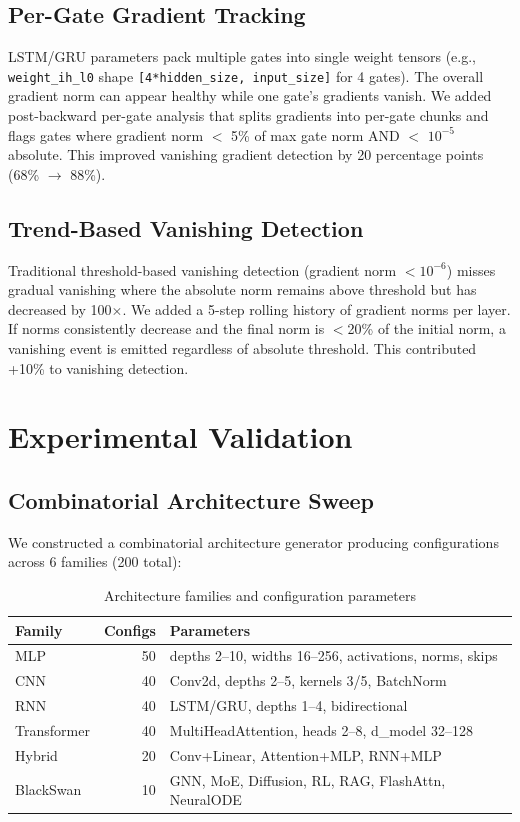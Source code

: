 \documentclass[11pt]{article}
\begin{document}
\subsection{Per-Gate Gradient Tracking}

LSTM/GRU parameters pack multiple gates into single weight tensors (e.g., \texttt{weight\_ih\_l0} shape \texttt{[4*hidden\_size, input\_size]} for 4 gates). The overall gradient norm can appear healthy while one gate's gradients vanish. We added post-backward per-gate analysis that splits gradients into per-gate chunks and flags gates where gradient norm $<$ 5\% of max gate norm AND $<$ $10^{-5}$ absolute. This improved vanishing gradient detection by 20 percentage points (68\% $\rightarrow$ 88\%).

\subsection{Trend-Based Vanishing Detection}

Traditional threshold-based vanishing detection (gradient norm $< 10^{-6}$) misses gradual vanishing where the absolute norm remains above threshold but has decreased by 100$\times$. We added a 5-step rolling history of gradient norms per layer. If norms consistently decrease and the final norm is $<$20\% of the initial norm, a vanishing event is emitted regardless of absolute threshold. This contributed +10\% to vanishing detection.

\section{Experimental Validation}

\subsection{Combinatorial Architecture Sweep}

We constructed a combinatorial architecture generator producing configurations across 6 families (200 total):

\begin{table}[h]
\centering
\caption{Architecture families and configuration parameters}
\begin{tabular}{lrl}
\toprule
\textbf{Family} & \textbf{Configs} & \textbf{Parameters} \\
\midrule
MLP & 50 & depths 2--10, widths 16--256, activations, norms, skips \\
CNN & 40 & Conv2d, depths 2--5, kernels 3/5, BatchNorm \\
RNN & 40 & LSTM/GRU, depths 1--4, bidirectional \\
Transformer & 40 & MultiHeadAttention, heads 2--8, d\_model 32--128 \\
Hybrid & 20 & Conv+Linear, Attention+MLP, RNN+MLP \\
BlackSwan & 10 & GNN, MoE, Diffusion, RL, RAG, FlashAttn, NeuralODE \\
\bottomrule
\end{tabular}
\end{table}
\end{document}
